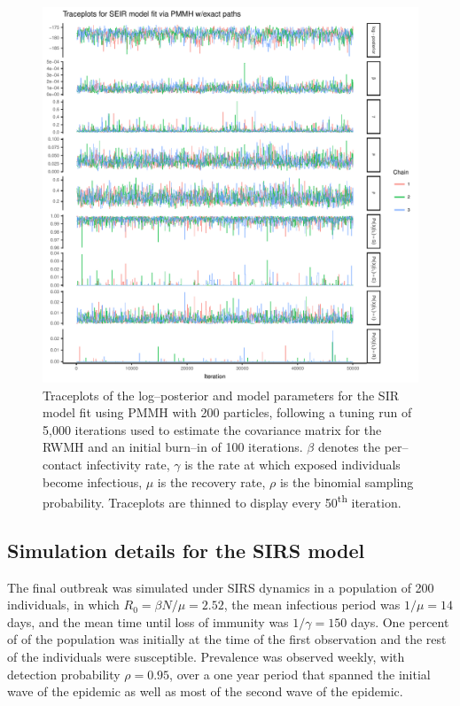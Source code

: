 \begin{figure}[htbp]
	\centering
	\includegraphics[width=0.9\linewidth]{figures/seir_pomp_exact_traceplots}
	\caption{Traceplots of the log--posterior and model parameters for the SIR model fit using PMMH with 200 particles, following a tuning run of 5,000 iterations used to estimate the covariance matrix for the RWMH and an initial burn--in of 100 iterations. $ \beta $ denotes the per--contact infectivity rate, $ \gamma $ is the rate at which exposed individuals become infectious, $ \mu $ is the recovery rate, $ \rho $ is the binomial sampling probability. Traceplots are thinned to display every 50\textsuperscript{th} iteration.}
	\label{fig:seirpompexacttraceplots}
\end{figure}

\newpage
\subsection{Simulation details for the SIRS model}
The final outbreak was simulated under SIRS dynamics in a population of 200 individuals, in which $ R_0 = \beta N / \mu = 2.52 $, the mean infectious period was $ 1/\mu = 14 $ days, and the mean time until loss of immunity was $ 1/\gamma = 150 $ days. One percent of of the population was initially at the time of the first observation and the rest of the individuals were susceptible. Prevalence was observed weekly, with detection probability $ \rho = 0.95 $, over a one year period that spanned the initial wave of the epidemic as well as most of the second wave of the epidemic. 

